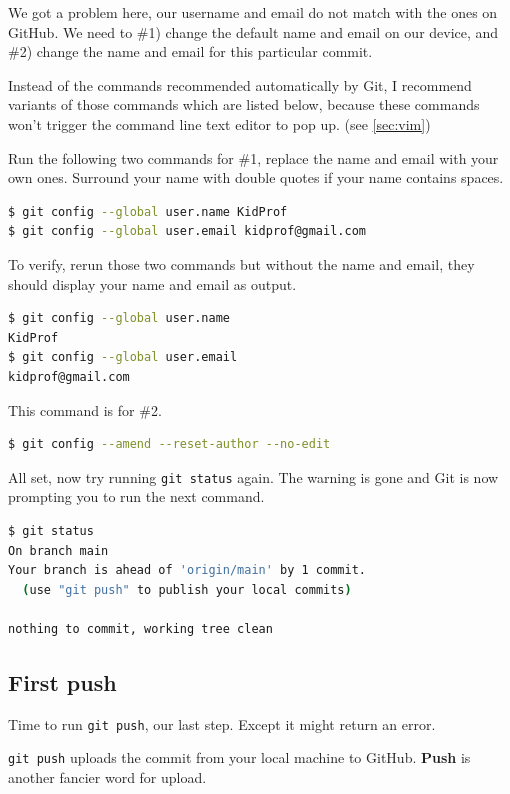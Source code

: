We got a problem here, our username and email do not match with the ones on GitHub. We need to \#1) change the default name and email on our device, and \#2) change the name and email for this particular commit.

Instead of the commands recommended automatically by Git, I recommend variants of those commands which are listed below, because these commands won't trigger the command line text editor to pop up. (see \cref{sec:vim})

Run the following two commands for \#1, replace the name and email with your own ones. Surround your name with double quotes if your name contains spaces.

\begin{lstlisting}[language=bash]
$ git config --global user.name KidProf
$ git config --global user.email kidprof@gmail.com
\end{lstlisting}

To verify, rerun those two commands but without the name and email, they should display your name and email as output.

\begin{lstlisting}[language=bash]
$ git config --global user.name
KidProf
$ git config --global user.email
kidprof@gmail.com
\end{lstlisting}

This command is for \#2.

\begin{lstlisting}[language=bash]
$ git config --amend --reset-author --no-edit
\end{lstlisting}

All set, now try running \texttt{git status} again. The warning is gone and Git is now prompting you to run the next command. 

\begin{lstlisting}[language=bash]
$ git status
On branch main
Your branch is ahead of 'origin/main' by 1 commit.
  (use "git push" to publish your local commits)

nothing to commit, working tree clean
\end{lstlisting}

\subsection*{First push}

Time to run \texttt{git push}, our last step. Except it might return an error.

\texttt{git push} uploads the commit from your local machine to GitHub. \textbf{Push} is another fancier word for upload.


